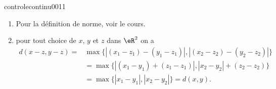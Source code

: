\begin{corrige}{controlecontinu0011}

  \begin{enumerate}
  \item Pour la définition de norme, voir le cours. 
  \item pour tout choice de $x$, $y$ et  $z$ dans $\eR^2$ on a 
    \begin{equation}
      \begin{aligned}
        d(x-z,y-z)= &\max \{|(x_1-z_1)-(y_1-z_1)|, |(x_2-z_2)-(y_2-z_2)|\}\\
        &=\max \{|(x_1-y_1)+(z_1-z_1)|, |x_2-y_2|+(z_2-z_2)\}\\
        &=\max \{|x_1-y_1|, |x_2-y_2|\} =d(x,y).
      \end{aligned}
    \end{equation}

  \end{enumerate}

\end{corrige}
